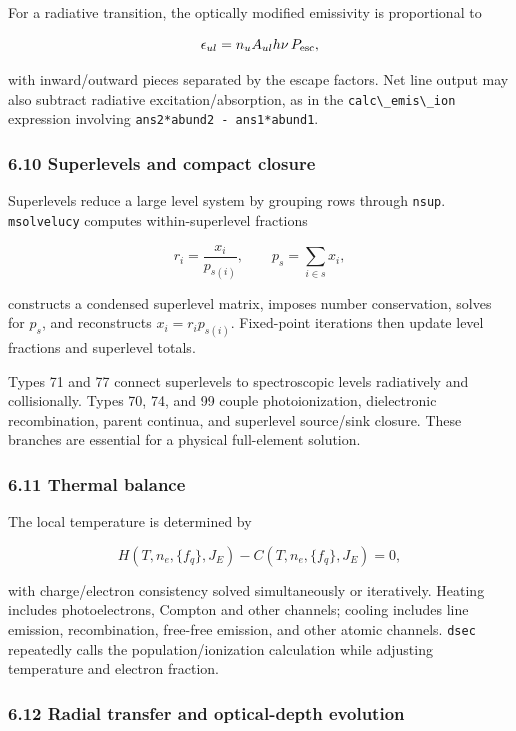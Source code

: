 \documentclass[
  10pt,
]{article}
\newcommand{\passthrough}[1]{#1}
\begin{document}
For a radiative transition, the optically modified emissivity is
proportional to

\[
\epsilon_{{ul}} = n_u A_{{ul}} h\nu\,P_{{\rm esc}},
\]

with inward/outward pieces separated by the escape factors. Net line
output may also subtract radiative excitation/absorption, as in the
\passthrough{\lstinline!calc\_emis\_ion!} expression involving
\passthrough{\lstinline!ans2*abund2 - ans1*abund1!}.

\subsubsection{6.10 Superlevels and compact
closure}\label{superlevels-and-compact-closure}

Superlevels reduce a large level system by grouping rows through
\passthrough{\lstinline!nsup!}. \passthrough{\lstinline!msolvelucy!}
computes within-superlevel fractions

\[
r_i=\frac{{x_i}}{{p_{{s(i)}}}},
\qquad
p_s=\sum_{{i\in s}}x_i,
\]

constructs a condensed superlevel matrix, imposes number conservation,
solves for \(p_s\), and reconstructs \(x_i=r_i p_{{s(i)}}\). Fixed-point
iterations then update level fractions and superlevel totals.

Types 71 and 77 connect superlevels to spectroscopic levels radiatively
and collisionally. Types 70, 74, and 99 couple photoionization,
dielectronic recombination, parent continua, and superlevel source/sink
closure. These branches are essential for a physical full-element
solution.

\subsubsection{6.11 Thermal balance}\label{thermal-balance}

The local temperature is determined by

\[
H(T,n_e,\{{f_q\}},J_E)-C(T,n_e,\{{f_q\}},J_E)=0,
\]

with charge/electron consistency solved simultaneously or iteratively.
Heating includes photoelectrons, Compton and other channels; cooling
includes line emission, recombination, free-free emission, and other
atomic channels. \passthrough{\lstinline!dsec!} repeatedly calls the
population/ionization calculation while adjusting temperature and
electron fraction.

\subsubsection{6.12 Radial transfer and optical-depth
evolution}\label{radial-transfer-and-optical-depth-evolution}
\end{document}
